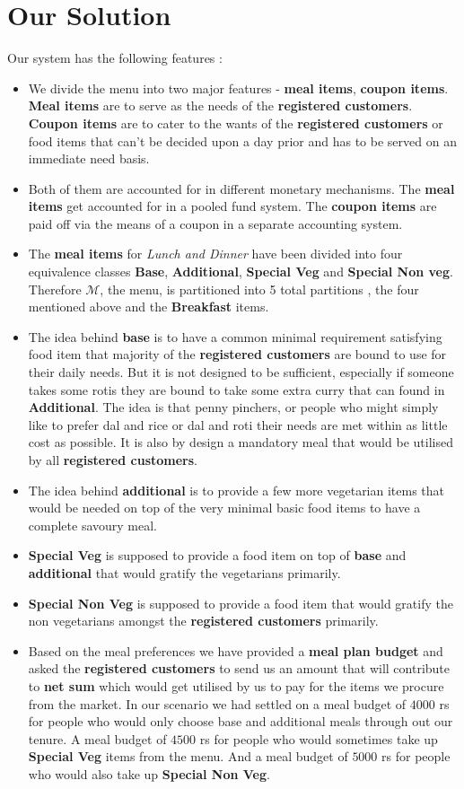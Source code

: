 \documentclass[12pt]{report}
\newcommand{\RC}{\textbf{registered customers}}
\begin{document}
\chapter{Our Solution}
Our system has the following features :
\begin{itemize}
\item We divide the menu into two major features - \textbf{meal items}, \textbf{coupon items}. \textbf{Meal items} are to serve as the needs of the {\RC}. \textbf{Coupon items} are to cater to the wants of the {\RC} or food items that can't be decided upon a day prior and has to be served on an immediate need basis.
\item Both of them are accounted for in different monetary mechanisms. The \textbf{meal items} get accounted for in a pooled fund system. The \textbf{coupon items} are paid off via the means of a coupon in a separate accounting system. 
\item The \textbf{meal items} for \textit{Lunch and Dinner} have been divided into four equivalence classes \textbf{Base}, \textbf{Additional}, \textbf{Special Veg} and \textbf{Special Non veg}. Therefore $\mathcal{M}$, the menu, is partitioned into 5 total partitions , the four mentioned above and the \textbf{Breakfast} items.
\item The idea behind \textbf{base} is to have a common minimal requirement satisfying food item that majority of the {\RC} are bound to use for their daily needs. But it is not designed to be sufficient, especially if someone takes some rotis they are bound to take some extra curry that can found in \textbf{Additional}. The idea is that penny pinchers, or people who might simply like to prefer dal and rice or dal and roti their needs are met within as little cost as possible. It is also by design a mandatory meal that would be utilised by all {\RC}.
\item The idea behind \textbf{additional} is to provide a few more vegetarian items that would be needed on top of the very minimal basic food items to have a complete savoury meal. 
\item \textbf{Special Veg} is supposed to provide a food item on top of \textbf{base} and \textbf{additional} that would gratify the vegetarians primarily.
\item \textbf{Special Non Veg} is supposed to provide a food item that would gratify the non vegetarians amongst the {\RC} primarily.
\item Based on the meal preferences we have provided a \textbf{meal plan budget} and asked the {\RC} to send us an amount that will contribute to \textbf{net sum} which would get utilised by us to pay for the items we procure from the market. In our scenario we had settled on a meal budget of $4000$ rs for people who would only choose base and additional meals through out our tenure. A meal budget of $4500$ rs for people who would sometimes take up \textbf{Special Veg} items from the menu. And a meal budget of $5000$ rs for people who would also take up \textbf{Special Non Veg}. 

\end{itemize}
\end{document}
